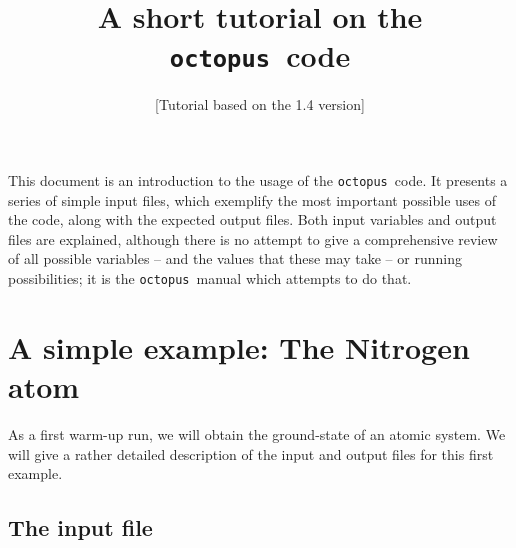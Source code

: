 \documentclass[10pt,a4paper,twoside]{article}
\newcommand{\octopus}{{\tt octopus}\ }
\begin{document}
\title{A short tutorial on the \octopus code}
\author{[Tutorial based on the 1.4 version]}
\maketitle


\begin{center}
\begin{minipage}{0.8\textwidth}
\small
This document is an introduction to the usage of the
\octopus code. It presents a series of simple
input files, which exemplify the most important
possible uses of the code, along with the expected
output files. Both input variables and output
files are explained, although there is no attempt
to give a comprehensive review of all possible variables
-- and the values that these may take --
or running possibilities; it is the \octopus manual
which attempts to do that.
\end{minipage}
\end{center}

\tableofcontents


\section{A simple example: The Nitrogen atom}

As a first warm-up run, we will obtain the ground-state
of an atomic system. We will give a rather detailed description
of the input and output files for this first example.

\subsection{The input file}
\end{document}
